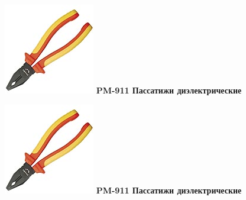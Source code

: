 \documentclass{magazine}
\begin{document}
\begin{multicols}{2}
\noindent\includegraphics[width=\columnwidth]{fig/00/pros/PM-911.jpg}
\textbf{PM-911 Пассатижи диэлектрические}

\noindent\includegraphics[width=\columnwidth]{fig/00/pros/PM-911.jpg}
\textbf{PM-911 Пассатижи диэлектрические}

\end{multicols}



\end{document}
